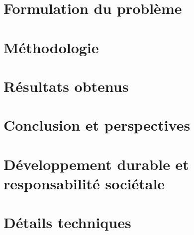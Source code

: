 \documentclass[language=fr, year=2A, enterprise=ensIIE]{ensiie-report}
\begin{document}

\section{Formulation du problème}\label{sec:formulation_probleme}


\newpage


\section{Méthodologie}\label{sec:methodologie}


\newpage


\section{Résultats obtenus}\label{sec:resultats_obtenus}


\newpage


\section{Conclusion et perspectives}\label{sec:conclusion}


\newpage


\appendix
\section{Développement durable et responsabilité sociétale}\label{sec:ddrs}


\newpage


\section{Détails techniques}\label{sec:details_techniques}


\newpage


\renewcommand{\refname}{Références}
\label{sec:references}

\newpage

\end{document}
